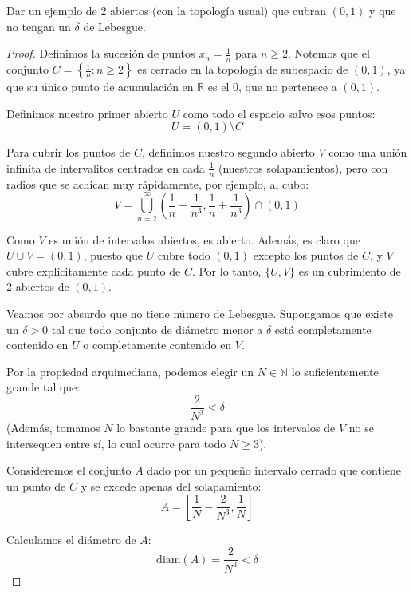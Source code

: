 \documentclass{article}
\theoremstyle{plain}
\theoremstyle{definition}
\newenvironment{ejercicio}[1]{\begin{trivlist}
\item[\hskip \labelsep {\bfseries Ejercicio}\hskip \labelsep {\bfseries #1.}]}{\end{trivlist}}
\begin{document}
\begin{ejercicio}{8}
    Dar un ejemplo de 2 abiertos (con la topología usual) que cubran \( (0, 1) \) y que no tengan un \( \delta \) de Lebesgue.
\end{ejercicio}
\begin{proof}
    Definimos la sucesión de puntos \( x_n = \frac{1}{n} \) para \( n \ge 2 \). Notemos que el conjunto \( C = \left \{ \frac{1}{n} : n \ge 2 \right \} \) es cerrado en la topología de subespacio de \( (0, 1) \), ya que su único punto de acumulación en \( \mathbb{R} \) es el \( 0 \), que no pertenece a \( (0, 1) \).

    Definimos nuestro primer abierto \( U \) como todo el espacio salvo esos puntos:
    \[ U = (0, 1) \setminus C \]

    Para cubrir los puntos de \( C \), definimos nuestro segundo abierto \( V \) como una unión infinita de intervalitos centrados en cada \( \frac{1}{n} \) (nuestros solapamientos), pero con radios que se achican muy rápidamente, por ejemplo, al cubo:
    \[ V = \bigcup_{n=2}^\infty \left( \frac{1}{n} - \frac{1}{n^3}, \frac{1}{n} + \frac{1}{n^3} \right) \cap (0, 1) \]

    Como \( V \) es unión de intervalos abiertos, es abierto. Además, es claro que \( U \cup V = (0, 1) \), puesto que \( U \) cubre todo \( (0, 1) \) excepto los puntos de \( C \), y \( V \) cubre explícitamente cada punto de \( C \). Por lo tanto, \( \{U, V\} \) es un cubrimiento de 2 abiertos de \( (0, 1) \).

    Veamos por absurdo que no tiene número de Lebesgue. Supongamos que existe un \( \delta > 0 \) tal que todo conjunto de diámetro menor a \( \delta \) está completamente contenido en \( U \) o completamente contenido en \( V \).

    Por la propiedad arquimediana, podemos elegir un \( N \in \mathbb{N} \) lo suficientemente grande tal que:
    \[ \frac{2}{N^3} < \delta \]
    (Además, tomamos \( N \) lo bastante grande para que los intervalos de \( V \) no se intersequen entre sí, lo cual ocurre para todo \( N \ge 3 \)).

    Consideremos el conjunto \( A \) dado por un pequeño intervalo cerrado que contiene un punto de \( C \) y se excede apenas del solapamiento:\[
        A = \left[ \frac{1}{N} - \frac{2}{N^3}, \frac{1}{N} \right]
    \]

    Calculamos el diámetro de \( A \):
    \[ \text{diam}(A) = \frac{2}{N^3} < \delta \]


\end{proof}
\end{document}
